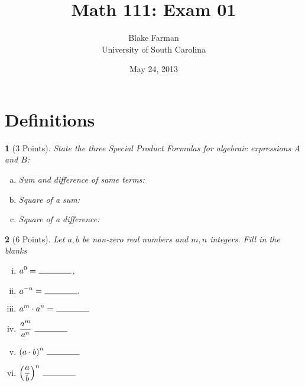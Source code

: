 \documentclass[12pt]{amsart}
\author{Blake Farman\\University of South Carolina}
\title{Math 111: Exam 01}
\date{May 24, 2013}
\begin{document}
\maketitle

\begin{center}
\end{center}

\vspace{0.2in}
\vspace{0.2in}

\theoremstyle{plain}
\newtheorem{thm}{}
\newtheorem{lem}{Lemma}
\theoremstyle{definition}
\newtheorem{defn}{Definition}

\section{Definitions}
\begin{thm}[3 Points]\label{ex1}
  State the three Special Product Formulas for algebraic expressions $A$ and $B$:
  \begin{enumerate}[(a)]
  \item
    Sum and difference of same terms:
    \vspace{.3in}
  \item
    Square of a sum:
    \vspace{.3in}
  \item
    Square of a difference:
    \vspace{.3in}
  \end{enumerate}
\end{thm}

\begin{thm}[6 Points]\label{ex2}
  Let $a, b$ be non-zero real numbers and $m, n$ integers.
  Fill in the blanks
  \begin{enumerate}[(i)]
  \item
    $\displaystyle{a^0 =\ \line(1,0){40}}$,
  \item
    $\displaystyle{a^{-n} =\ \line(1,0){40}}.$
  \item
    $\displaystyle{a^m \cdot a^n =\ \line(1,0){40}}$
  \item
    $\displaystyle{\frac{a^m}{a^n}\ \line(1,0){40}}$
  \item
    $\displaystyle{\left(a \cdot b\right)^n\ \line(1,0){40}}$
  \item
    $\displaystyle{\left(\frac{a}{b}\right)^n\ \line(1,0){40}}$
  \end{enumerate}
\end{thm}
\end{document}
